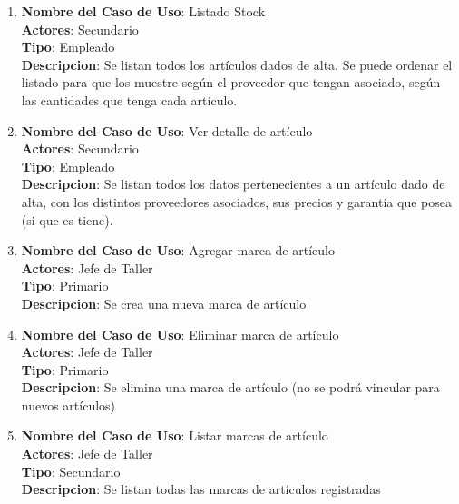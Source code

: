 \documentclass[12pt]{extarticle}
\begin{document}
\begin{spacing}{1.2}
\begin{enumerate}
            \item 	\textbf{Nombre del Caso de Uso}: Listado Stock\\
                    \textbf{Actores}: Secundario\\
                    \textbf{Tipo}: Empleado\\
                    \textbf{Descripcion}: Se listan todos los artículos dados de alta. Se puede ordenar el listado para que los muestre según el proveedor que tengan asociado, según las cantidades que tenga cada artículo. 

            \item 	\textbf{Nombre del Caso de Uso}: Ver detalle de artículo\\
                    \textbf{Actores}: Secundario\\
                    \textbf{Tipo}: Empleado\\
                    \textbf{Descripcion}: Se listan todos los datos pertenecientes a un artículo dado de alta, con los distintos proveedores asociados, sus precios y garantía que posea (si que es tiene).

            \item 	\textbf{Nombre del Caso de Uso}: Agregar marca de artículo\\
                    \textbf{Actores}: Jefe de Taller\\
                    \textbf{Tipo}: Primario\\
                    \textbf{Descripcion}: Se crea una nueva marca de artículo

            \item 	\textbf{Nombre del Caso de Uso}: Eliminar marca de artículo\\
                    \textbf{Actores}: Jefe de Taller\\
                    \textbf{Tipo}: Primario\\
                    \textbf{Descripcion}: Se elimina una marca de artículo (no se podrá vincular para nuevos artículos)

            \item 	\textbf{Nombre del Caso de Uso}: Listar marcas de artículo\\
                    \textbf{Actores}: Jefe de Taller\\
                    \textbf{Tipo}: Secundario\\
                    \textbf{Descripcion}: Se listan todas las marcas de artículos registradas	




\end{enumerate}
\end{spacing}
\end{document}
